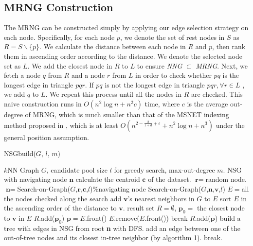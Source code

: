 \documentclass{vldb}
\begin{document}
\subsection{MRNG Construction}
The MRNG can be constructed simply by applying our edge selection strategy on each node. Specifically, for each node $p$, we denote the set of rest nodes in $S$ as $R = S\backslash\{p\}$. We calculate the distance between each node in $R$ and $p$, then rank them in ascending order according to the distance. We denote the selected node set as $L$. We add the closest node in $R$ to $L$ to ensure \textit{NNG} $\subset$ \textit{MRNG}. Next, we fetch a node $q$ from $R$ and a node $r$ from $L$ in order to check whether $pq$ is the longest edge in triangle $pqr$. If $pq$ is not the longest edge in triangle $pqr, \forall r \in L$ , we add $q$ to $L$. We repeat this process until all the nodes in $R$ are checked. This naive construction runs in $O(n^2\log n + n^2c)$ time, where $c$ is the average out-degree of MRNG, which is much smaller than that of the MSNET indexing method proposed in \cite{dearholt1988monotonic}, which is at least $O(n^{2-\frac{2}{1+d} +\epsilon} + n^2\log n + n^3)$ under the general position assumption.

\begin{algorithm}[t]\small
	\caption{NSGbuild($G$, $l$, $m$)}
	\label{NSGbuild_alg}
	\begin{algorithmic}[1]
		\Require $k$NN Graph $G$, candidate pool size $l$ for greedy search, max-out-degree $m$.
		\Ensure NSG with navigating node $\textbf{n}$
		\State calculate the centroid $\textbf{c}$ of the dataset.
		\State $\textbf{r} = $random node.
		\State $\textbf{n} = $Search-on-Graph($G$,$\textbf{r}$,$\textbf{c}$,$l$)\%navigating node
		\State Search-on-Graph($G$,$\textbf{n}$,$\textbf{v}$,$l$)
		\State $E = $all the nodes checked along the search
		\State add $\textbf{v}$'s nearest neighbors in $G$ to $E$ 
		\State sort $E$ in the ascending order of the distance to $\textbf{v}$.
		\State result set $R = \emptyset$, $\textbf{p}_0 = $ the closest node to $\textbf{v}$ in $E$
		\State $R$.add($\textbf{p}_0$)
		\State $\textbf{p} = E$.front()
		\State $E$.remove($E$.front())
		\State break
		\EndIf
		\EndFor
		\State $R$.add($\textbf{p}$)
		\EndIf
		\EndWhile
		\EndFor
		\State build a tree with edges in NSG from root \textbf{n} with DFS.
		\State add an edge between one of the out-of-tree nodes and \State its closest in-tree neighbor (by algorithm 1).
		\Else
		\State break.
		\EndIf
		\EndWhile
	\end{algorithmic}
\end{algorithm}
\end{document}
